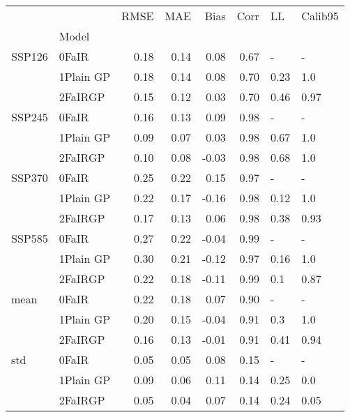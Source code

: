 \begin{tabular}{llrrrrll}
\toprule
    &         &  RMSE &   MAE &  Bias &  Corr &    LL & Calib95 \\
{} & Model &       &       &       &       &       &         \\
\midrule
SSP126 & 0FaIR &  0.18 &  0.14 &  0.08 &  0.67 &     - &       - \\
    & 1Plain GP &  0.18 &  0.14 &  0.08 &  0.70 &  0.23 &     1.0 \\
    & 2FaIRGP &  0.15 &  0.12 &  0.03 &  0.70 &  0.46 &    0.97 \\
SSP245 & 0FaIR &  0.16 &  0.13 &  0.09 &  0.98 &     - &       - \\
    & 1Plain GP &  0.09 &  0.07 &  0.03 &  0.98 &  0.67 &     1.0 \\
    & 2FaIRGP &  0.10 &  0.08 & -0.03 &  0.98 &  0.68 &     1.0 \\
SSP370 & 0FaIR &  0.25 &  0.22 &  0.15 &  0.97 &     - &       - \\
    & 1Plain GP &  0.22 &  0.17 & -0.16 &  0.98 &  0.12 &     1.0 \\
    & 2FaIRGP &  0.17 &  0.13 &  0.06 &  0.98 &  0.38 &    0.93 \\
SSP585 & 0FaIR &  0.27 &  0.22 & -0.04 &  0.99 &     - &       - \\
    & 1Plain GP &  0.30 &  0.21 & -0.12 &  0.97 &  0.16 &     1.0 \\
    & 2FaIRGP &  0.22 &  0.18 & -0.11 &  0.99 &   0.1 &    0.87 \\
mean & 0FaIR &  0.22 &  0.18 &  0.07 &  0.90 &     - &       - \\
    & 1Plain GP &  0.20 &  0.15 & -0.04 &  0.91 &   0.3 &     1.0 \\
    & 2FaIRGP &  0.16 &  0.13 & -0.01 &  0.91 &  0.41 &    0.94 \\
std & 0FaIR &  0.05 &  0.05 &  0.08 &  0.15 &     - &       - \\
    & 1Plain GP &  0.09 &  0.06 &  0.11 &  0.14 &  0.25 &     0.0 \\
    & 2FaIRGP &  0.05 &  0.04 &  0.07 &  0.14 &  0.24 &    0.05 \\
\bottomrule
\end{tabular}
